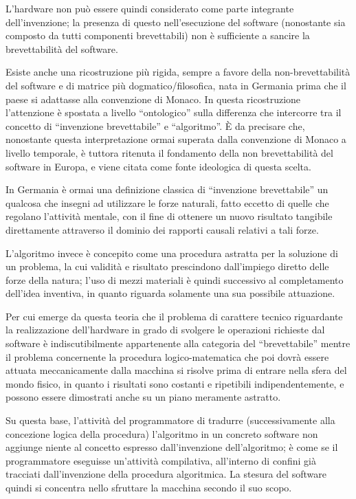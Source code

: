 L'hardware non può essere quindi considerato come parte integrante dell'invenzione; la presenza di questo nell'esecuzione del software (nonostante sia composto da tutti componenti brevettabili) non è sufficiente a sancire la brevettabilità del software.

Esiste anche una ricostruzione più rigida, sempre a favore della non-brevettabilità del software e di matrice più dogmatico/filosofica, nata in Germania prima che il paese si adattasse alla convenzione di Monaco. In questa ricostruzione l'attenzione è spostata a livello ``ontologico'' sulla differenza che intercorre tra il concetto di ``invenzione brevettabile'' e ``algoritmo''. \`E da precisare che, nonostante questa interpretazione ormai superata dalla convenzione di Monaco a livello temporale, è tuttora ritenuta il fondamento della non brevettabilità del software in Europa, e viene citata come fonte ideologica di questa scelta.

In Germania è ormai una definizione classica di ``invenzione brevettabile'' un qualcosa che insegni ad utilizzare le forze naturali, fatto eccetto di quelle che regolano l'attività mentale, con il fine di ottenere un nuovo risultato tangibile direttamente attraverso il dominio dei rapporti causali relativi a tali forze.

L'algoritmo invece è concepito come una procedura astratta per la soluzione di un problema, la cui validità e risultato prescindono dall'impiego diretto delle forze della natura; l'uso di mezzi materiali è quindi successivo al completamento dell'idea inventiva, in quanto riguarda solamente una sua possibile attuazione.

Per cui emerge da questa teoria che il problema di carattere tecnico riguardante la realizzazione dell'hardware in grado di svolgere le operazioni richieste dal software è indiscutibilmente appartenente alla categoria del ``brevettabile'' mentre il problema concernente la procedura logico-matematica che poi dovrà essere attuata meccanicamente dalla macchina si risolve prima di entrare nella sfera del mondo fisico, in quanto i risultati sono costanti e ripetibili indipendentemente, e possono essere dimostrati anche su un piano meramente astratto.

Su questa base, l'attività del programmatore di tradurre (successivamente alla concezione logica della procedura) l'algoritmo in un concreto software non aggiunge niente al concetto espresso dall'invenzione dell'algoritmo; è come se il programmatore eseguisse un'attività compilativa, all'interno di confini già tracciati dall'invenzione della procedura algoritmica. La stesura del software quindi si concentra nello sfruttare la macchina secondo il suo scopo.

